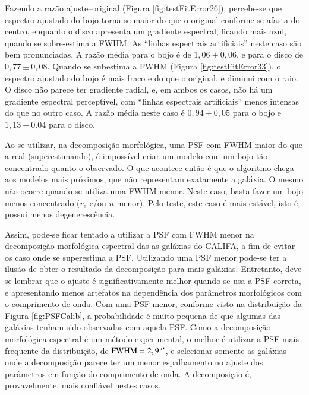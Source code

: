 Fazendo a razão ajuste--original (Figura \ref{fig:testFitError26}), percebe-se
que espectro ajustado do bojo torna-se maior do que o original conforme se
afasta do centro, enquanto o disco apresenta um gradiente espectral, ficando
mais azul, quando se sobre-estima a FWHM. As ``linhas espectrais artificiais''
neste caso são bem pronunciadas. A razão média para o bojo é de $1,06 \pm 0,06$,
e para o disco de $0,77 \pm 0,08$. Quando se subestima a FWHM (Figura
\ref{fig:testFitError33}), o espectro ajustado do bojo é mais fraco e do que o
original, e diminui com o raio. O disco não parece ter gradiente radial, e, em
ambos os casos, não há um gradiente espectral perceptível, com ``linhas
espectrais artificiais'' menos intensas do que no outro caso. A razão média
neste caso é $0,94 \pm 0,05$ para o bojo e $1,13 \pm 0.04$ para o disco.

Ao se utilizar, na decomposição morfológica, uma PSF com FWHM maior do que a
real (superestimando), é impossível criar um modelo com um bojo tão concentrado
quanto o observado. O que acontece então é que o algoritmo chega aos modelos
mais próximos, que não representam exatamente a galáxia. O mesmo não ocorre
quando se utiliza uma FWHM menor. Neste caso, basta fazer um bojo menos
concentrado ($r_e$ e/ou $n$ menor). Pelo teste, este caso é mais estável, isto
é, possui menos degenerescência.

Assim, pode-se ficar tentado a utilizar a PSF com FWHM menor na decomposição
morfológica espectral das as galáxias do CALIFA, a fim de evitar os caso onde se
superestima a PSF. Utilizando uma PSF menor pode-se ter a ilusão de obter o
resultado da decomposição para mais galáxias. Entretanto, deve-se lembrar que o
ajuste é significativamente melhor quando se usa a PSF correta, e apresentando
menos artefatos na dependência dos parâmetros morfológicos com o comprimento de
onda. Com uma PSF menor, conforme visto na distribuição da Figura
\ref{fig:PSFCalib}, a probabilidade é muito pequena de que algumas das galáxias
tenham sido observadas com aquela PSF. Como a decomposição morfológica espectral
é um método experimental, o melhor é utilizar a PSF mais frequente da
distribuição, de $\mathrm{FWHM} = 2,9\,^{\prime\prime}$, e selecionar somente as galáxias
onde a decomposição parece ter um menor espalhamento no ajuste dos parâmetros em
função do comprimento de onda. A decomposição é, provavelmente, mais confiável
nestes casos.

